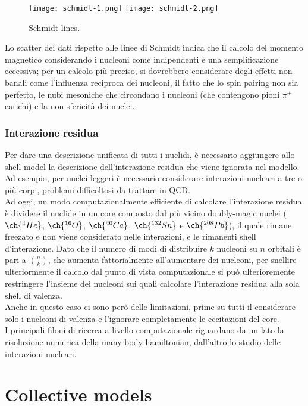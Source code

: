 \begin{figure}[!t]
	\texttt{[image: schmidt-1.png]}
	\texttt{[image: schmidt-2.png]}
	\caption{Schmidt lines.}
	\label{schmidt}
\end{figure}

Lo scatter dei dati rispetto alle linee di Schmidt indica che il calcolo del momento magnetico considerando i nucleoni come indipendenti è una semplificazione eccessiva; per un calcolo più preciso, si dovrebbero considerare degli effetti non-banali come l'influenza reciproca dei nucleoni, il fatto che lo spin pairing non sia perfetto, le nubi mesoniche che circondano i nucleoni (che contengono pioni $ \pi^{\pm} $ carichi) e la non sfericità dei nuclei.

\subsubsection{Interazione residua}

Per dare una descrizione unificata di tutti i nuclidi, è necessario aggiungere allo shell model la descrizione dell'interazione residua che viene ignorata nel modello. Ad esempio, per nuclei leggeri è necessario considerare interazioni nucleari a tre o più corpi, problemi difficoltosi da trattare in QCD.\\
Ad oggi, un modo computazionalmente efficiente di calcolare l'interazione residua è dividere il nuclide in un core composto dal più vicino doubly-magic nuclei ($ \ch{^4He} $, $ \ch{^{16}O} $, $ \ch{^{40}Ca} $, $ \ch{^{132}Sn} $ e $ \ch{^{208}Pb} $), il quale rimane freezato e non viene considerato nelle interazioni, e le rimanenti shell d'interazione. Dato che il numero di modi di distribuire $ k $ nucleoni su $ n $ orbitali è pari a $ \binom{n}{k} $, che aumenta fattorialmente all'aumentare dei nucleoni, per snellire ulteriormente il calcolo dal punto di vista computazionale si può ulterioremente restringere l'insieme dei nucleoni sui quali calcolare l'interazione residua alla sola shell di valenza.\\
Anche in questo caso ci sono però delle limitazioni, prime su tutti il considerare solo i nucleoni di valenza e l'ignorare completamente le eccitazioni del core.\\
I principali filoni di ricerca a livello computazionale riguardano da un lato la risoluzione numerica della many-body hamiltonian, dall'altro lo studio delle interazioni nucleari.

\section{Collective models}

